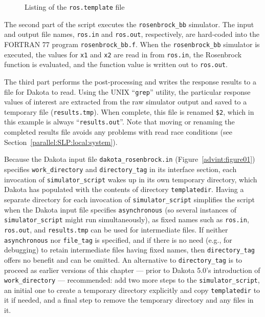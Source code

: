 \begin{figure}
  \centering
  \begin{bigbox}
    \begin{small}
    \end{small}
  \end{bigbox}
  \caption{Listing of the \texttt{ros.template} file}
  \label{advint:figure04}
\end{figure}

The second part of the script executes the \texttt{rosenbrock\_bb}
simulator. The input and output file names, \texttt{ros.in} and
\texttt{ros.out}, respectively, are hard-coded into the FORTRAN 77
program \texttt{rosenbrock\_bb.f}. When the \texttt{rosenbrock\_bb}
simulator is executed, the values for \texttt{x1} and \texttt{x2} are
read in from \texttt{ros.in}, the Rosenbrock function is evaluated,
and the function value is written out to \texttt{ros.out}.

The third part performs the post-processing and writes the response
results to a file for Dakota to read. Using the UNIX ``\texttt{grep}'' utility, the
particular response values of interest are extracted from the raw
simulator output and saved to a temporary file (\texttt{results.tmp}).
When complete, this file is renamed \texttt{\$2}, which in this
example is always ``\texttt{results.out}''.
Note that moving or renaming the completed results file
avoids any problems with read race
conditions (see Section~\ref{parallel:SLP:local:system}).


Because the Dakota input file \texttt{dakota\_rosenbrock.in}
(Figure~\ref{advint:figure01}) specifies
\texttt{work\_directory} and \texttt{directory\_tag} in its interface
section, each invocation of \texttt{simulator\_script} wakes up in
its own temporary directory, which Dakota has populated with the
contents of directory \texttt{templatedir}. Having a separate directory
for each invocation of \texttt{simulator\_script} simplifies the script
when the Dakota input file specifies \texttt{asynchronous} (so
several instances of \texttt{simulator\_script} might run simultaneously),
as fixed names such as \texttt{ros.in}, \texttt{ros.out}, and \texttt{results.tmp}
can be used for intermediate files. If neither \texttt{asynchronous} nor
\texttt{file\_tag} is specified, and if there is no need (e.g., for debugging)
to retain intermediate files having fixed names, then \texttt{directory\_tag}
offers no benefit and can be omitted. An alternative to \texttt{directory\_tag}
is to proceed as earlier versions of this chapter --- prior to Dakota 5.0's
introduction of \texttt{work\_directory} --- recommended:  add two more
steps to the \texttt{simulator\_script},
an initial one to create a temporary directory explicitly and
copy \texttt{templatedir} to it if needed, and a final step to remove the temporary
directory and any files in it.

